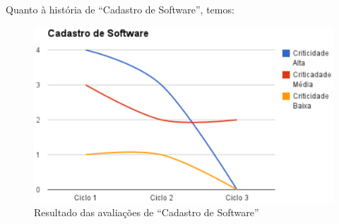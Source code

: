 Quanto à história de ``Cadastro de  Software'', temos:

\begin{figure}[h!]
    	\centering
    	\includegraphics[keepaspectratio=true,scale=0.62]
      		{figuras/graf03.eps}
    	\caption{Resultado das avaliações de ``Cadastro de Software''}
    	\label{avaliacaoinstitucion}
\end{figure}

